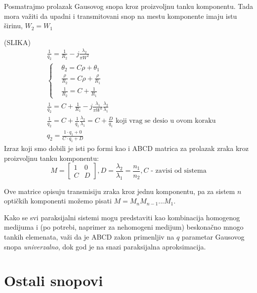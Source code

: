 \documentclass[fleqn]{report}
\begin{document}
Posmatrajmo prolazak Gausovog snopa kroz proizvoljnu tanku komponentu.
Tada mora važiti da upadni i transmitovani snop na mestu komponente imaju istu širinu, $W_2 = W_1$

(SLIKA)
\begin{align*}
     & \frac{1}{q_2} = \frac{1}{R_2} - j\frac{\lambda_2}{\pi W^2}                                                                \\
     & \begin{cases}
            & \theta_2 = C \rho + \theta_1                \\
            & \frac{\rho}{R_2} = C\rho + \frac{\rho}{R_1} \\
            & \frac{1}{R_2} = C + \frac{1}{R_1}
       \end{cases}                                                                        \\
     & \frac{1}{q_2} = C + \frac{1}{R_1} - j\frac{\lambda_1}{\pi W^2}\frac{\lambda_2}{\lambda_1}                                 \\
     & \frac{1}{q_2} = C + \frac{1}{q_1}\frac{\lambda_2}{\lambda_1} = C + \frac{D}{q_1} \text{ koji vrag se desio u ovom koraku} \\
     & q_2 = \frac{1 \cdot q_1 + 0}{C \cdot q_1 + D}
\end{align*}
Izraz koji smo dobili je isti po formi kao i ABCD matrica za prolazak zraka kroz proizvoljnu tanku komponentu:
\begin{equation*}
    M = \begin{bmatrix}
        1 & 0 \\
        C & D
    \end{bmatrix}, D = \frac{\lambda_2}{\lambda_1} = \frac{n_1}{n_2}, C \text{ - zavisi od sistema}
\end{equation*}

Ove matrice opisuju transmisiju zraka kroz jednu komponentu, pa za sistem $n$ optičkih komponenti možemo pisati $M = M_n M_{n - 1}...M_1$.

Kako se svi paraksijalni sistemi mogu predstaviti kao kombinacija homogenog medijuma i (po potrebi, naprimer za nehomogeni medijum) beskonačno mnogo tankih elemenata, važi da je ABCD zakon primenljiv na $q$ parametar Gausovog snopa \emph{univerzalno}, dok god je na snazi paraksijalna aproksimacija.

\section{Ostali snopovi}
\end{document}
